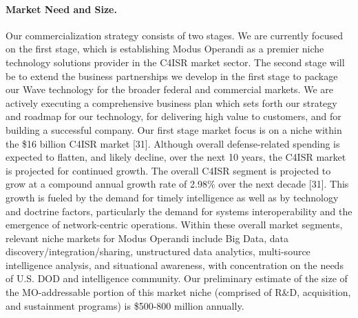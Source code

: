 \documentclass{sbir}
\begin{document}
\paragraph{Market Need and Size.} Our commercialization strategy consists of two stages. We are currently focused on the first stage, which is establishing Modus Operandi as a premier niche technology solutions provider in the C4ISR market sector. The second stage will be to extend the business partnerships we develop in the first stage to package our Wave technology for the broader federal and commercial markets.
We are actively executing a comprehensive business plan which sets forth our strategy and roadmap for our technology, for delivering high value to customers, and for building a successful company. Our first stage market focus is on a niche within the \$16 billion C4ISR market [31]. Although overall defense-related spending is expected to flatten, and likely decline, over the next 10 years, the C4ISR market is projected for continued growth. The overall C4ISR segment is projected to grow at a compound annual growth rate of 2.98\% over the next decade [31]. This growth is fueled by the demand for timely intelligence as well as by technology and doctrine factors, particularly the demand for systems interoperability and the emergence of network-centric operations.
Within these overall market segments, relevant niche markets for Modus Operandi include Big Data, data discovery/integration/sharing, unstructured data analytics, multi-source intelligence analysis, and situational awareness, with concentration on the needs of U.S. DOD and intelligence community. Our preliminary estimate of the size of the MO-addressable portion of this market niche (comprised of R\&D, acquisition, and sustainment programs) is \$500-800 million annually.
\end{document}
